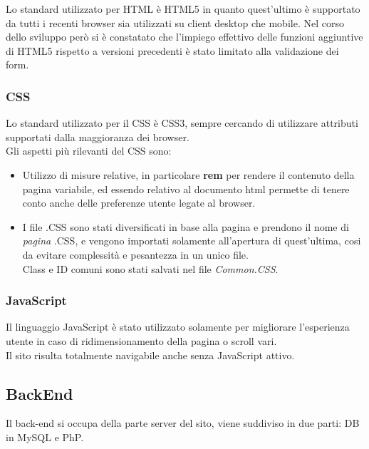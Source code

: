 Lo standard utilizzato per HTML è HTML5 in quanto quest’ultimo è supportato da tutti i recenti browser sia utilizzati su client desktop che mobile.
Nel corso dello sviluppo però si è constatato che l’impiego effettivo delle funzioni aggiuntive di HTML5 rispetto a versioni precedenti è stato limitato alla validazione dei form.


\subsubsection{CSS}
Lo standard utilizzato per il CSS è CSS3, sempre cercando di utilizzare attributi supportati dalla maggioranza dei browser.\\
Gli aspetti più rilevanti del CSS sono:
\begin{itemize}
	\item Utilizzo di misure relative, in particolare \textbf{rem} per rendere il contenuto della pagina variabile, ed essendo relativo al documento html permette di tenere conto anche delle preferenze utente legate al browser.
	\item I file .CSS sono stati diversificati in base alla pagina e prendono il nome di \textit{pagina} .CSS, e vengono importati solamente all'apertura di quest'ultima, cosi da evitare complessità e pesantezza in un unico file.\\Class e ID comuni sono stati salvati nel file \textit{Common.CSS}.
\end{itemize}

\subsubsection{JavaScript}
Il linguaggio JavaScript è stato utilizzato solamente per migliorare l'esperienza utente in caso di ridimensionamento della pagina o scroll vari.\\ Il sito risulta totalmente navigabile anche senza JavaScript attivo.

\subsection{BackEnd}
Il back-end si occupa della parte server del sito, viene suddiviso in due parti: DB in MySQL e PhP.

